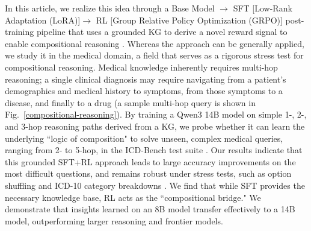 \documentclass{article}
\theoremstyle{plain}
\theoremstyle{definition}
\theoremstyle{remark}
\begin{document}
In this article, we realize this idea through a Base Model $\rightarrow$ SFT [Low-Rank Adaptation (LoRA)]$\rightarrow$ RL [Group Relative Policy Optimization (GRPO)] post-training pipeline that uses a grounded KG to derive a novel reward signal to enable compositional reasoning \citep{hu2022lora, guo2025deepseek, yasunaga2021qa}. Whereas the approach can be generally applied, we study it in the medical domain, a field that serves as a rigorous stress test for compositional reasoning. Medical knowledge inherently requires multi-hop reasoning; a single clinical diagnosis may require navigating from a patient's demographics and medical history to symptoms, from those symptoms to a disease, and finally to a drug (a sample multi-hop query is shown in Fig.~\ref{compositional-reasoning}). By training a Qwen3 14B model \cite{yang2025qwen3} on simple 1-, 2-, and 3-hop reasoning paths derived from a KG, we probe whether it can learn the underlying ``logic of composition" to solve unseen, complex medical queries, ranging from 2- to 5-hop, in the ICD-Bench test suite \citep{Dedhia2025Bottom-upNeed}. Our results indicate that this grounded SFT+RL approach leads to large accuracy improvements on the most difficult questions, and remains robust under stress tests, such as option shuffling and ICD-10 category breakdowns \citep{whoICD10}. We find that while SFT provides the necessary knowledge base, RL acts as the ``compositional bridge." We demonstrate that insights learned on an 8B model transfer effectively to a 14B model, outperforming larger reasoning and frontier models. %

    
\end{document}
